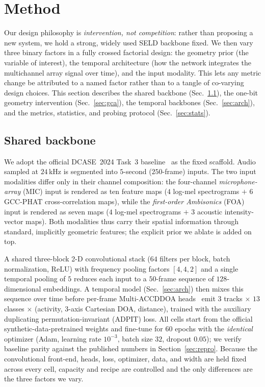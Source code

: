 \section{Method}
\label{sec:method}

Our design philosophy is \emph{intervention, not competition}: rather than
proposing a new system, we hold a strong, widely used SELD backbone fixed. We
then vary three binary factors in a fully crossed factorial design: the geometry
prior (the variable of interest), the temporal architecture (how the network
integrates the multichannel array signal over time), and the input modality. This
lets any metric change be attributed to a named factor rather than to a tangle of
co-varying design choices. This section describes the shared backbone
(Sec.~\ref{sec:backbone}), the one-bit geometry intervention
(Sec.~\ref{sec:gca}), the temporal backbones (Sec.~\ref{sec:arch}), and the
metrics, statistics, and probing protocol (Sec.~\ref{sec:stats}).

\subsection{Shared backbone}
\label{sec:backbone}
We adopt the official DCASE~2024 Task~3 baseline~\cite{krause2024sde} as the
fixed scaffold. Audio sampled at $24$\,kHz is segmented into $5$-second
($250$-frame) inputs. The two input modalities differ only in their channel
composition: the four-channel \emph{microphone-array} (MIC) input is rendered as
ten feature maps ($4$ log-mel spectrograms $+$ $6$ GCC-PHAT cross-correlation
maps), while the \emph{first-order Ambisonics} (FOA) input is rendered as seven
maps ($4$ log-mel spectrograms $+$ $3$ acoustic intensity-vector maps). Both
modalities thus carry their spatial information through standard, implicitly
geometric features; the explicit prior we ablate is added on top.

A shared three-block 2-D convolutional stack ($64$ filters per block, batch
normalization, ReLU) with frequency pooling factors $[4,4,2]$ and a single
temporal pooling of $5$ reduces each input to a $50$-frame sequence of
$128$-dimensional embeddings. A temporal model (Sec.~\ref{sec:arch}) then mixes
this sequence over time before per-frame Multi-ACCDDOA
heads~\cite{shimada2022multiaccdoa} emit $3$ tracks $\times$ $13$ classes
$\times$ (activity, $3$-axis Cartesian DOA, distance), trained with the auxiliary
duplicating permutation-invariant (ADPIT) loss. All cells start from the official
synthetic-data-pretrained weights and fine-tune for $60$ epochs with the
\emph{identical} optimizer (Adam, learning rate $10^{-3}$, batch size $32$,
dropout $0.05$); we verify baseline parity against the published numbers in
Section~\ref{sec:repro}. Because the convolutional front-end, heads, loss,
optimizer, data, and width are held fixed across every cell, capacity and recipe
are controlled and the only differences are the three factors we vary.

